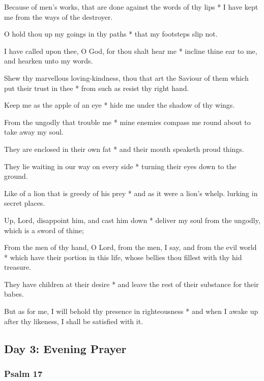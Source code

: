 Because of men's works, that are done against the words of thy lips * I have kept me from the ways of the destroyer.

O hold thou up my goings in thy paths * that my footsteps slip not.

I have called upon thee, O God, for thou shalt hear me * incline thine ear to me, and hearken unto my words.

Shew thy marvellous loving-kindness, thou that art the Saviour of them which put their trust in thee * from such as resist thy right hand.

Keep me as the apple of an eye * hide me under the shadow of thy wings.

From the ungodly that trouble me * mine enemies compass me round about to take away my soul.

They are enclosed in their own fat * and their mouth speaketh proud things.

They lie waiting in our way on every side * turning their eyes down to the ground.

Like of a lion that is greedy of his prey * and as it were a lion's whelp. lurking in secret places.

Up, Lord, disappoint him, and cast him down * deliver my soul from the ungodly, which is a sword of thine;

From the men of thy hand, O Lord, from the men, I say, and from the evil world * which have their portion in this life, whose bellies thou fillest with thy hid treasure.

They have children at their desire * and leave the rest of their substance for their babes.

But as for me, I will behold thy presence in righteousness * and when I awake up after thy likeness, I shall be satisfied with it.

\subsection{Day 3: Evening Prayer}

\subsubsection{Psalm 17}


